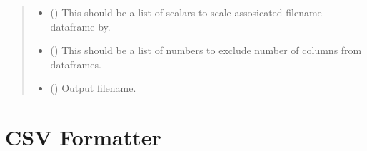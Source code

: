 \documentclass[letterpaper,10pt,english,openany,oneside]{sphinxmanual}
\begin{document}
\begin{fulllineitems}
\begin{quote}
\begin{description}
\begin{itemize}
\item {} 
 (\sphinxstyleliteralemphasis{\sphinxupquote{{[}}}\sphinxstyleliteralemphasis{\sphinxupquote{{]}}}\sphinxstyleliteralemphasis{\sphinxupquote{}}) \textendash{} This should be a list of scalars to scale assosicated filename dataframe by.

\item {} 
 (\sphinxstyleliteralemphasis{\sphinxupquote{{[}}}\sphinxstyleliteralemphasis{\sphinxupquote{{]}}}\sphinxstyleliteralemphasis{\sphinxupquote{}}) \textendash{} This should be a list of numbers to exclude number of columns from dataframes.

\item {} 
 () \textendash{} Output filename.

\end{itemize}

\end{description}\end{quote}

\end{fulllineitems}



\chapter{CSV Formatter}
\label{\detokenize{index:csv-formatter}}\label{\detokenize{index:module-CSVFormatter}}
\end{document}
